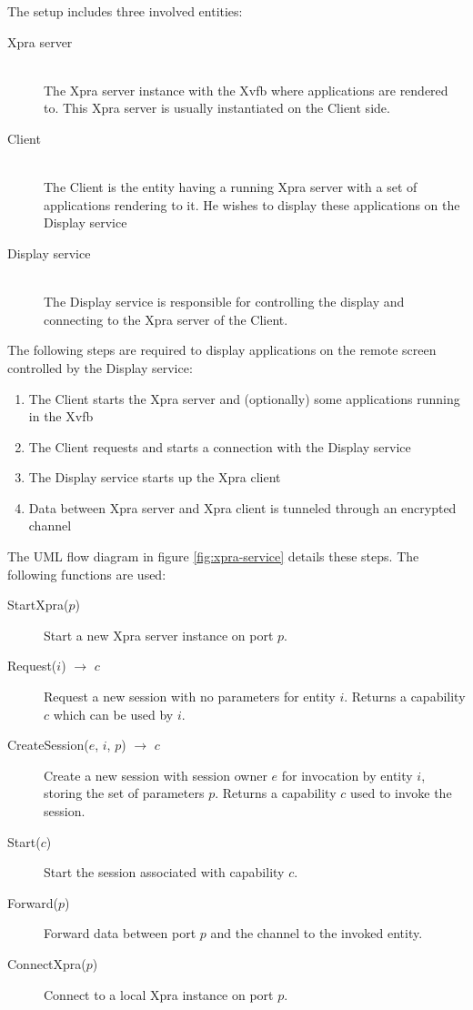 The setup includes three involved entities:
\begin{description}
    \item[Xpra server]\hfill\\
        The Xpra server instance with the Xvfb where applications are rendered to.
        This Xpra server is usually instantiated on the Client side.
    \item[Client]\hfill\\
        The Client is the entity having a running Xpra server with a set of applications rendering to it.
        He wishes to display these applications on the Display service
    \item[Display service]\hfill\\
        The Display service is responsible for controlling the display and connecting to the Xpra server of the Client.
\end{description}

The following steps are required to display applications on the remote screen controlled by the Display service:
\begin{enumerate}
    \item The Client starts the Xpra server and (optionally) some applications running in the Xvfb
    \item The Client requests and starts a connection with the Display service
    \item The Display service starts up the Xpra client
    \item Data between Xpra server and Xpra client is tunneled through an encrypted channel
\end{enumerate}

The UML flow diagram in figure \ref{fig:xpra-service} details these steps.
The following functions are used:

\begin{description}
    \item[StartXpra($p$)]
        Start a new Xpra server instance on port $p$.
    \item[Request($i$) $\rightarrow$ $c$]
        Request a new session with no parameters for entity $i$.
        Returns a capability $c$ which can be used by $i$.
    \item[CreateSession($e$, $i$, $p$) $\rightarrow$ $c$]
        Create a new session with session owner $e$ for invocation by entity $i$, storing the set of parameters $p$.
        Returns a capability $c$ used to invoke the session.
    \item[Start($c$)]
        Start the session associated with capability $c$.
    \item[Forward($p$)]
        Forward data between port $p$ and the channel to the invoked entity.
    \item[ConnectXpra($p$)]
        Connect to a local Xpra instance on port $p$.
\end{description}

